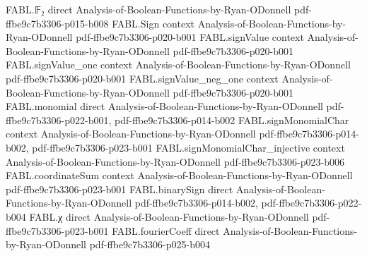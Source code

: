 \begin{theorem}
\label{FABL.CNFFormula.size_lower_bound_of_computes_parity}
\leanok
{}
\proofstep
  {FABL.𝔽₂}
  {direct}
  {Analysis-of-Boolean-Functions-by-Ryan-ODonnell}
  {pdf-ffbe9c7b3306-p015-b008}
\proofstep
  {FABL.Sign}
  {context}
  {Analysis-of-Boolean-Functions-by-Ryan-ODonnell}
  {pdf-ffbe9c7b3306-p020-b001}
\proofstep
  {FABL.signValue}
  {context}
  {Analysis-of-Boolean-Functions-by-Ryan-ODonnell}
  {pdf-ffbe9c7b3306-p020-b001}
\proofstep
  {FABL.signValue_one}
  {context}
  {Analysis-of-Boolean-Functions-by-Ryan-ODonnell}
  {pdf-ffbe9c7b3306-p020-b001}
\proofstep
  {FABL.signValue_neg_one}
  {context}
  {Analysis-of-Boolean-Functions-by-Ryan-ODonnell}
  {pdf-ffbe9c7b3306-p020-b001}
\proofstep
  {FABL.monomial}
  {direct}
  {Analysis-of-Boolean-Functions-by-Ryan-ODonnell}
  {pdf-ffbe9c7b3306-p022-b001,
    pdf-ffbe9c7b3306-p014-b002}
\proofstep
  {FABL.signMonomialChar}
  {context}
  {Analysis-of-Boolean-Functions-by-Ryan-ODonnell}
  {pdf-ffbe9c7b3306-p014-b002,
    pdf-ffbe9c7b3306-p023-b001}
\proofstep
  {FABL.signMonomialChar_injective}
  {context}
  {Analysis-of-Boolean-Functions-by-Ryan-ODonnell}
  {pdf-ffbe9c7b3306-p023-b006}
\proofstep
  {FABL.coordinateSum}
  {context}
  {Analysis-of-Boolean-Functions-by-Ryan-ODonnell}
  {pdf-ffbe9c7b3306-p023-b001}
\proofstep
  {FABL.binarySign}
  {direct}
  {Analysis-of-Boolean-Functions-by-Ryan-ODonnell}
  {pdf-ffbe9c7b3306-p014-b002,
    pdf-ffbe9c7b3306-p022-b004}
\proofstep
  {FABL.χ}
  {direct}
  {Analysis-of-Boolean-Functions-by-Ryan-ODonnell}
  {pdf-ffbe9c7b3306-p023-b001}
\proofstep
  {FABL.fourierCoeff}
  {direct}
  {Analysis-of-Boolean-Functions-by-Ryan-ODonnell}
  {pdf-ffbe9c7b3306-p025-b004}
\proofstep

\end{theorem}
